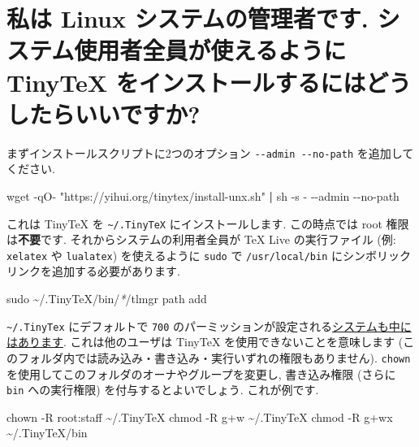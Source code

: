 \documentclass[
  xelatex,ja=standard,jafont=noto]{bxjsreport}
\newenvironment{Shaded}{\begin{snugshade}}{\end{snugshade}}
\newcommand{\AttributeTok}[1]{\textcolor[rgb]{0.77,0.63,0.00}{#1}}
\newcommand{\FunctionTok}[1]{\textcolor[rgb]{0.00,0.00,0.00}{#1}}
\newcommand{\KeywordTok}[1]{\textcolor[rgb]{0.13,0.29,0.53}{\textbf{#1}}}
\newcommand{\NormalTok}[1]{#1}
\newcommand{\PreprocessorTok}[1]{\textcolor[rgb]{0.56,0.35,0.01}{\textit{#1}}}
\newcommand{\StringTok}[1]{\textcolor[rgb]{0.31,0.60,0.02}{#1}}
\begin{document}
\hypertarget{sys-install}{%
\section{私は Linux システムの管理者です.
システム使用者全員が使えるように TinyTeX
をインストールするにはどうしたらいいですか?}\label{sys-install}}

まずインストールスクリプトに2つのオプション
\texttt{-\/-admin\ -\/-no-path} を追加してください.

\begin{Shaded}
\begin{Highlighting}[]
\FunctionTok{wget} \AttributeTok{{-}qO{-}} \StringTok{"https://yihui.org/tinytex/install{-}unx.sh"} \KeywordTok{|} \FunctionTok{sh} \AttributeTok{{-}s} \AttributeTok{{-}} \AttributeTok{{-}{-}admin} \AttributeTok{{-}{-}no{-}path}
\end{Highlighting}
\end{Shaded}

これは TinyTeX を \texttt{\textasciitilde{}/.TinyTeX}
にインストールします. この時点では root 権限は\textbf{不要}です.
それからシステムの利用者全員が TeX Live の実行ファイル (例:
\texttt{xelatex} や \texttt{lualatex}) を使えるように \texttt{sudo} で
\texttt{/usr/local/bin} にシンボリックリンクを追加する必要があります.

\begin{Shaded}
\begin{Highlighting}[]
\FunctionTok{sudo}\NormalTok{ \textasciitilde{}/.TinyTeX/bin/}\PreprocessorTok{*}\NormalTok{/tlmgr path add}
\end{Highlighting}
\end{Shaded}

\texttt{\textasciitilde{}/.TinyTex} にデフォルトで \texttt{700}
のパーミッションが設定される\href{https://github.com/yihui/tinytex/issues/37}{システムも中にはあります}.
これは他のユーザは TinyTeX を使用できないことを意味します
(このフォルダ内では読み込み・書き込み・実行いずれの権限もありません).
\texttt{chown} を使用してこのフォルダのオーナやグループを変更し,
書き込み権限 (さらに \texttt{bin} への実行権限)
を付与するとよいでしょう. これが例です.

\begin{Shaded}
\begin{Highlighting}[]
\FunctionTok{chown} \AttributeTok{{-}R}\NormalTok{ root:staff \textasciitilde{}/.TinyTeX}
\FunctionTok{chmod} \AttributeTok{{-}R}\NormalTok{ g+w \textasciitilde{}/.TinyTeX}
\FunctionTok{chmod} \AttributeTok{{-}R}\NormalTok{ g+wx \textasciitilde{}/.TinyTeX/bin}
\end{Highlighting}
\end{Shaded}
\end{document}
